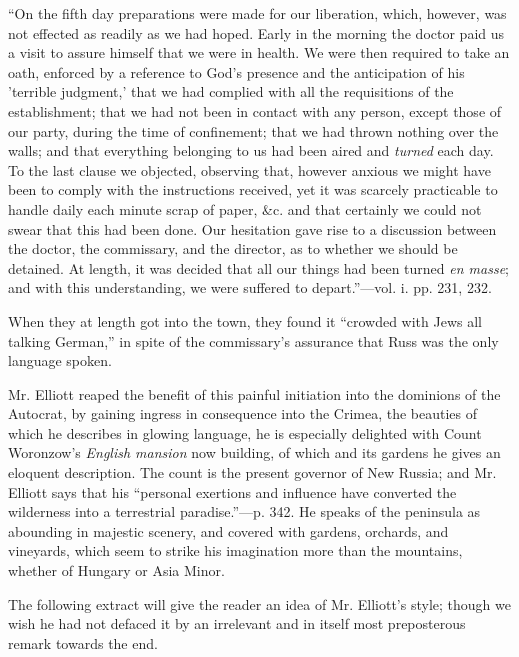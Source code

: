 ``On
the fifth day preparations were made for our liberation, which, however,
was not effected as readily as we had hoped. Early in the morning the
doctor paid us a visit to assure himself that we were in health. We were
then required to take an oath, enforced by a reference to God's presence
and the anticipation of his 'terrible judgment,' that we had complied
with all the requisitions of the establishment; that we had not been in
contact with any person, except those of our party, during the time of
confinement; that we had thrown nothing over the walls; and that
everything belonging to us had been aired and \emph{turned} each day. To
the last clause we objected, observing that, however anxious we might
have been to comply with the instructions received, yet it was scarcely
practicable to handle daily each minute scrap of paper, \&c. and that
certainly we could not swear that this had been done. Our hesitation
gave rise to a discussion between the doctor, the commissary, and the
director, as to whether we should be detained. At length, it was decided
that all our things had been turned \emph{en masse}; and with this
understanding, we were suffered to depart.''—vol. i. pp. 231, 232.

When they
at length got into the town, they found it ``crowded with Jews all
talking German,'' in spite of the commissary's assurance that Russ was
the only language spoken.

Mr. Elliott
reaped the benefit of this painful initiation into the dominions of the
Autocrat, by gaining ingress in consequence into the Crimea, the
beauties of which he describes in glowing language, he is
especially delighted with Count Woronzow's \emph{English mansion} now
building, of which and its gardens he gives an eloquent description. The
count is the present governor of New Russia; and Mr. Elliott says that
his ``personal exertions and influence have converted the wilderness into
a terrestrial paradise.''—p. 342. He speaks of the peninsula as
abounding in majestic scenery, and covered with gardens, orchards, and
vineyards, which seem to strike his imagination more than the mountains,
whether of Hungary or Asia Minor.

The
following extract will give the reader an idea of Mr. Elliott's style;
though we wish he had not defaced it by an irrelevant and in itself most
preposterous remark towards the end.

